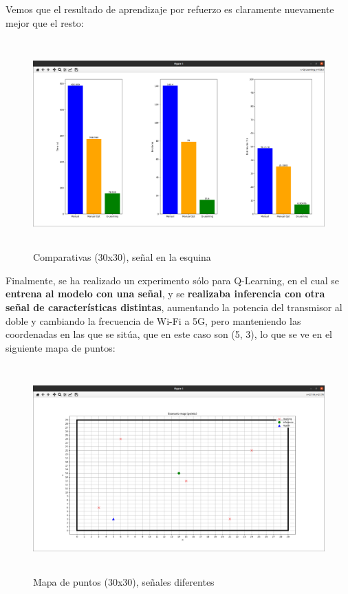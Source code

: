Vemos que el resultado de aprendizaje por refuerzo es claramente nuevamente mejor que el resto:\\

\begin{figure} [H]
    \begin{center}
    \includegraphics[height=8cm]{imagenes/cap4/24_comp_esq_30.png}
    \end{center}
    \caption[Comparativas (30x30), señal en la esquina]{Comparativas (30x30), señal en la esquina}
    \label{fig:comp_esq_30}
\end{figure}

Finalmente, se ha realizado un experimento sólo para Q-Learning, en el cual se \textbf{entrena al modelo con una señal}, y se \textbf{realizaba inferencia con otra señal de características distintas}, aumentando la potencia del transmisor al doble y cambiando la frecuencia de Wi-Fi a 5G, pero manteniendo las coordenadas en las que se sitúa, que en este caso son (5, 3), lo que se ve en el siguiente mapa de puntos:\\

\begin{figure} [H]
    \begin{center}
    \includegraphics[height=8cm]{imagenes/cap4/25_mapa_p_diff.png}
    \end{center}
    \caption[Mapa de puntos (30x30), señales diferentes]{Mapa de puntos (30x30), señales diferentes}
    \label{fig:map_p_diff_30}
\end{figure}

